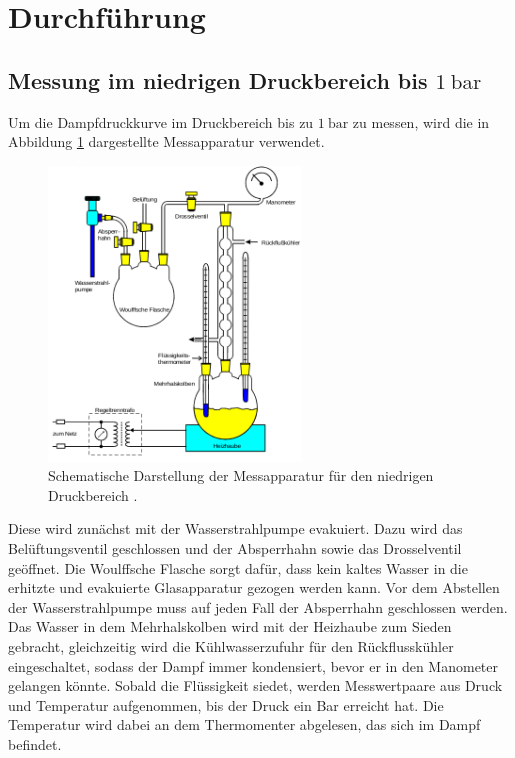 \section{Durchführung}
\label{sec:Durchführung}
\subsection{Messung im niedrigen Druckbereich bis $\SI{1}{\bar}$}
Um die Dampfdruckkurve im Druckbereich bis zu $\SI{1}{\bar}$ zu messen, wird die
in Abbildung \ref{fig:messapparatur1} dargestellte Messapparatur verwendet.
\begin{figure}
  \centering
  \includegraphics[width=0.6\textwidth]{messapparatur1.png}
  \caption{Schematische Darstellung der Messapparatur für den niedrigen
  Druckbereich \cite{sample}.}
  \label{fig:messapparatur1}
\end{figure}
Diese wird zunächst mit der Wasserstrahlpumpe evakuiert. Dazu wird das
Belüftungsventil geschlossen und der Absperrhahn sowie das Drosselventil geöffnet.
Die Woulffsche Flasche sorgt dafür, dass kein kaltes Wasser in die erhitzte und
evakuierte Glasapparatur gezogen werden kann. Vor dem Abstellen der Wasserstrahlpumpe
muss auf jeden Fall der Absperrhahn geschlossen werden. Das Wasser in dem
Mehrhalskolben wird mit der Heizhaube zum Sieden gebracht, gleichzeitig wird die
Kühlwasserzufuhr für den Rückflusskühler eingeschaltet, sodass der Dampf immer
kondensiert, bevor er in den Manometer gelangen könnte. Sobald die Flüssigkeit
siedet, werden Messwertpaare aus Druck und Temperatur aufgenommen, bis der Druck
ein Bar erreicht hat. Die Temperatur wird dabei an dem Thermomenter abgelesen,
das sich im Dampf befindet.


